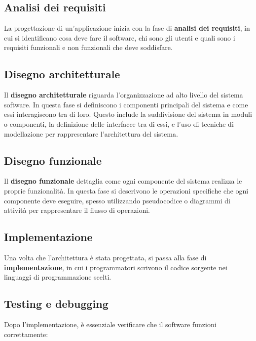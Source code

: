 \documentclass[
  letterpaper,
]{scrbook}
\begin{document}
\subsection{Analisi dei requisiti}\label{analisi-dei-requisiti}

La progettazione di un'applicazione inizia con la fase di
\textbf{analisi dei requisiti}, in cui si identificano cosa deve fare il
software, chi sono gli utenti e quali sono i requisiti funzionali e non
funzionali che deve soddisfare.

\subsection{Disegno architetturale}\label{disegno-architetturale}

Il \textbf{disegno architetturale} riguarda l'organizzazione ad alto
livello del sistema software. In questa fase si definiscono i componenti
principali del sistema e come essi interagiscono tra di loro. Questo
include la suddivisione del sistema in moduli o componenti, la
definizione delle interfacce tra di essi, e l'uso di tecniche di
modellazione per rappresentare l'architettura del sistema.

\subsection{Disegno funzionale}\label{disegno-funzionale}

Il \textbf{disegno funzionale} dettaglia come ogni componente del
sistema realizza le proprie funzionalità. In questa fase si descrivono
le operazioni specifiche che ogni componente deve eseguire, spesso
utilizzando pseudocodice o diagrammi di attività per rappresentare il
flusso di operazioni.

\subsection{Implementazione}\label{implementazione}

Una volta che l'architettura è stata progettata, si passa alla fase di
\textbf{implementazione}, in cui i programmatori scrivono il codice
sorgente nei linguaggi di programmazione scelti.

\subsection{Testing e debugging}\label{testing-e-debugging}

Dopo l'implementazione, è essenziale verificare che il software funzioni
correttamente:
\end{document}
